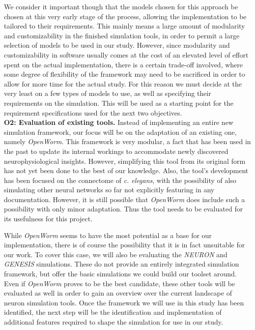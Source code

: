 \documentclass[a4paper,11pt]{article}
\begin{document}
We consider it important though that the models chosen for this approach be chosen at this very early stage of the process, allowing the implementation to be tailored to their requirements. This mainly means a large amount of modularity and customizability in the finished simulation tools, in order to permit a large selection of models to be used in our study. However, since modularity and customizability in software usually comes at the cost of an elevated level of effort spent on the actual implementation, there is a certain trade-off involved, where some degree of flexibility of the framework may need to be sacrificed in order to allow for more time for the actual study.
For this reason we must decide at the very least on a few types of models to use, as well as specifying their requirements on the simulation. This will be used as a starting point for the requirement specifications used for the next two objectives.
\\[0.2cm]

\textbf{O2: Evaluation of existing tools.} 
Instead of implementing an entire new simulation framework, our focus will be on the adaptation of an existing one, namely \emph{OpenWorm}. This framework is very modular, a fact that has been used in the past to update its internal workings to accommodate newly discovered neurophysiological insights. However, simplifying this tool from its original form has not yet been done to the best of our knowledge. Also, the tool's development has been focused on the connectome of \emph{c. elegans}, with the possibility of also simulating other neural networks so far not explicitly featuring in any documentation. However, it is still possible that \emph{OpenWorm} does include such a possibility with only minor adaptation. Thus the tool needs to be evaluated for its usefulness for this project.

While \emph{OpenWorm} seems to have the most potential as a base for our implementation, there is of course the possibility that it is in fact unsuitable for our work. To cover this case, we will also be evaluating the \emph{NEURON} and \emph{GENESIS} simulations. These do not provide an entirely integrated simulation framework, but offer the basic simulations we could build our toolset around. Even if \emph{OpenWorm} proves to be the best candidate, these other tools will be evaluated as well in order to gain an overview over the current landscape of neuron simulation tools.
Once the framework we will use in this study has been identified, the next step will be the identification and implementation of additional features required to shape the simulation for use in our study.
\end{document}
